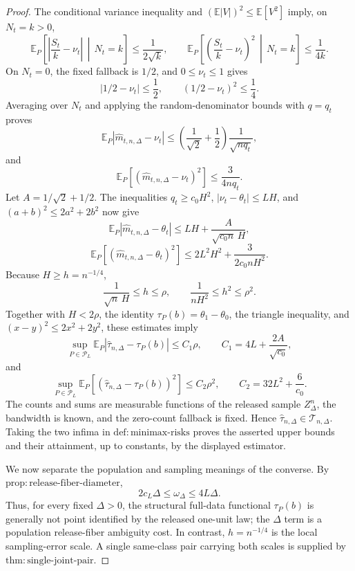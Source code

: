 \documentclass{article}
\begin{document}
\begin{proof}
The conditional variance inequality and \((\mathbb E|V|)^2\leq\mathbb E[V^2]\) imply, on \(N_t=k>0\),
\[
 \mathbb E_P\!\left[\left|\frac{S_t}{k}-\nu_t\right|\,\middle|\,N_t=k\right]
 \leq\frac1{2\sqrt k},
 \qquad
 \mathbb E_P\!\left[\left(\frac{S_t}{k}-\nu_t\right)^2\,\middle|\,N_t=k\right]
 \leq\frac1{4k}.
\]
On \(N_t=0\), the fixed fallback is \(1/2\), and \(0\leq\nu_t\leq1\) gives
\[
 |1/2-\nu_t|\leq\frac12,
 \qquad (1/2-\nu_t)^2\leq\frac14.
\]
Averaging over \(N_t\) and applying the random-denominator bounds with \(q=q_t\) proves
\[
 \mathbb E_P|\widehat m_{t,n,\Delta}-\nu_t|
 \leq\left(\frac1{\sqrt2}+\frac12\right)\frac1{\sqrt{nq_t}},
\]
and
\[
 \mathbb E_P[(\widehat m_{t,n,\Delta}-\nu_t)^2]
 \leq\frac3{4nq_t}.
\]
Let \(A=1/\sqrt2+1/2\).  The inequalities \(q_t\geq c_0H^2\), \(|\nu_t-\theta_t|\leq LH\), and \((a+b)^2\leq2a^2+2b^2\) now give
\[
 \mathbb E_P|\widehat m_{t,n,\Delta}-\theta_t|
 \leq LH+\frac{A}{\sqrt{c_0n}\,H},
\]
\[
 \mathbb E_P[(\widehat m_{t,n,\Delta}-\theta_t)^2]
 \leq2L^2H^2+\frac3{2c_0nH^2}.
\]
Because \(H\geq h=n^{-1/4}\),
\[
 \frac1{\sqrt n\,H}\leq h\leq\rho,
 \qquad
 \frac1{nH^2}\leq h^2\leq\rho^2.
\]
Together with \(H<2\rho\), the identity \(\tau_P(b)=\theta_1-\theta_0\), the triangle inequality, and \((x-y)^2\leq2x^2+2y^2\), these estimates imply
\[
 \sup_{P\in\mathcal P_L}
 \mathbb E_P|\widehat\tau_{n,\Delta}-\tau_P(b)|
 \leq C_1\rho,
 \qquad
 C_1=4L+\frac{2A}{\sqrt{c_0}},
\]
and
\[
 \sup_{P\in\mathcal P_L}
 \mathbb E_P[(\widehat\tau_{n,\Delta}-\tau_P(b))^2]
 \leq C_2\rho^2,
 \qquad
 C_2=32L^2+\frac6{c_0}.
\]
The counts and sums are measurable functions of the released sample \(Z_\Delta^n\), the bandwidth is known, and the zero-count fallback is fixed.  Hence \(\widehat\tau_{n,\Delta}\in\mathcal T_{n,\Delta}\).  Taking the two infima in \(\mathrm{def:minimax\text{-}risks}\) proves the asserted upper bounds and their attainment, up to constants, by the displayed estimator.

We now separate the population and sampling meanings of the converse.  By \(\mathrm{prop:release\text{-}fiber\text{-}diameter}\),
\[
 2c_L\Delta\leq\omega_\Delta\leq4L\Delta.
\]
Thus, for every fixed \(\Delta>0\), the structural full-data functional \(\tau_P(b)\) is generally not point identified by the released one-unit law; the \(\Delta\) term is a population release-fiber ambiguity cost.  In contrast, \(h=n^{-1/4}\) is the local sampling-error scale.  A single same-class pair carrying both scales is supplied by \(\mathrm{thm:single\text{-}joint\text{-}pair}\).


\end{proof}
\end{document}
